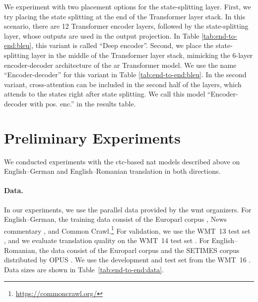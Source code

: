 We experiment with two placement options for the state-splitting layer. First,
we try placing the state splitting at the end of the Transformer layer
stack. In this scenario, there are 12 Transformer encoder layers, followed by
the state-splitting layer, whose outputs are used in the output projection. In
Table \ref{tab:end-to-end:bleu}, this variant is called ``Deep
encoder''. Second, we place the state-splitting layer in the middle of the
Transformer layer stack, mimicking the 6-layer encoder-decoder architecture of
the \ac{ar} Transformer model. We use the name ``Encoder-decoder'' for this
variant in Table \ref{tab:end-to-end:bleu}. In the second variant,
cross-attention can be included in the second half of the layers, which attends
to the states right after state splitting. We call this model ``Encoder-decoder
with pos. enc.'' in the results table.

\section{Preliminary Experiments}%
\label{sec:ctc:experiments}


We conducted experiments with the \ac{ctc}-based \ac{nat} models described
above on English--German and English--Romanian translation in both directions.

\paragraph{Data.}
In our experiments, we use the parallel data provided by the \ac{wmt}
organizers. For English--German, the training data consist of the Europarl
corpus \citep{koehn-2005-europarl}, News commentary
\citep{tiedemann-2012-parallel}, and Common
Crawl.\footnote{\url{https://commoncrawl.org/}} For validation, we use the
WMT~13 test set \citep{bojar-etal-2013-findings}, and we evaluate translation
quality on the WMT~14 test set \citep{bojar-etal-2014-findings}. For
English--Romanian, the data consist of the Europarl corpus and the SETIMES
corpus distributed by OPUS \citep{tiedemann-2012-parallel}. We use the
development and test set from the WMT~16 \citep{bojar-etal-2016-findings}. Data
sizes are shown in Table~\ref{tab:end-to-end:data}.

